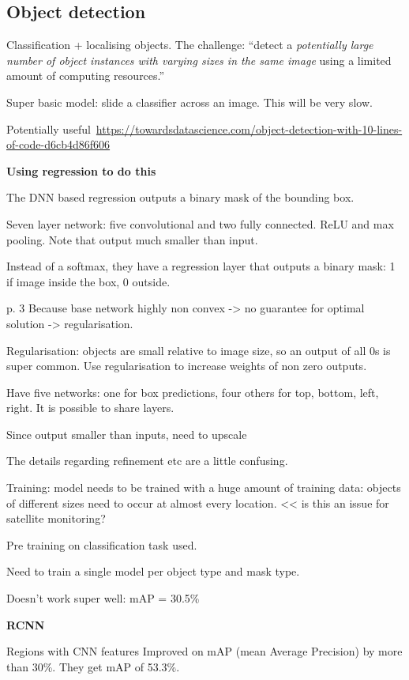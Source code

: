 \documentclass[12pt, a4paper, oneside, headinclude, footinclude]{article}
\begin{document}
\subsection{Object detection}

Classification + localising objects. The challenge: ``detect a \textit{potentially large
number of object instances with varying sizes in the same image} using a
limited amount of computing resources.''~\cite[Their emphasis]{NIPS2013_5207}

Super basic model: slide a classifier across an image. This will be very slow.

Potentially
useful~\url{https://towardsdatascience.com/object-detection-with-10-lines-of-code-d6cb4d86f606}

\textbf{Using regression to do this}~\cite{NIPS2013_5207}

The DNN based regression outputs a binary mask of the bounding box. 

Seven layer network: five convolutional and two fully connected. ReLU and max
pooling. Note that output much smaller than input.

Instead of a softmax, they have a regression layer that outputs a binary mask:
1 if image inside the box, 0 outside.\ 

p. 3 Because base network highly non convex -> no guarantee for optimal solution ->
regularisation.

Regularisation: objects are small relative to image size, so an output of all
0s is super common. Use regularisation to increase weights of non zero
outputs.

Have five networks: one for box predictions, four others for {top, bottom,
left, right}. 
It is possible to share layers. 

Since output smaller than inputs, need to upscale

The details regarding refinement etc are a little confusing. 

Training: model needs to be trained with a huge amount of training data:
objects of different sizes need to occur at almost every location. << is this
an issue for satellite monitoring?

Pre training on classification task used.

Need to train a single model per object type and mask type.

Doesn't work super well: mAP = 30.5\%

\textbf{RCNN}~\cite{Girshick2014, Girshick2015}

Regions with CNN features
Improved on mAP (mean Average Precision) by more than 30\%. They get mAP of
53.3\%. 
\end{document}
